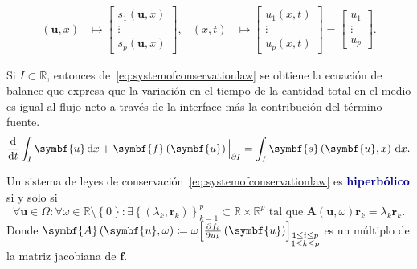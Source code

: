 \begin{definition}
\begin{align*}
		\left(\symbf{u},x\right)                             &
		\longmapsto
		\begin{bmatrix}
			s_{1}\left(\symbf{u},x\right) \\
			\vdots                        \\
			s_{p}\left(\symbf{u},x\right)
		\end{bmatrix},                     &
		\left(x,t\right)                                     &
		\longmapsto
		\begin{bmatrix}
			u_{1}\left(x,t\right) \\
			\vdots                \\
			u_{p}\left(x,t\right)
		\end{bmatrix}=
		\begin{bmatrix}
			u_{1}  \\
			\vdots \\
			u_{p}
		\end{bmatrix}.
	\end{align*}
\end{definition}
Si $I\subset\mathbb{R}$, entonces
de~\eqref{eq:systemofconservationlaw} se obtiene la ecuación de
balance que expresa que la variación en el tiempo de la cantidad
total en el medio es igual al flujo neto a través de la interface
más la contribución del término fuente.
\begin{equation*}
	\diff{}{t}
	\int_{I}\symbf{u}\dl x+
	{\symbf{f}\left(\symbf{u}\right)\Big|}_{\partial I}=
	\int_{I}\symbf{s}\left(\symbf{u},x\right)\dl x.
\end{equation*}

\begin{definition}
	Un sistema de leyes de
	conservación~\eqref{eq:systemofconservationlaw} es
	\textcolor{DarkBlue}{\bfseries hiperbólico} si y solo si
	\begin{equation}
		\forall\symbf{u}\in\Omega\!:
		\forall\omega\in\mathbb{R}\setminus\left\{0\right\}\!:
		\exists
		{\left\{
			\left(\lambda_{k},\symbf{r}_{k}\right)
			\right\}}^{p}_{k=1}\subset
		\mathbb{R}\times\mathbb{R}^{p}
		\text{ tal que }
		\symbf{A}\left(\symbf{u},\omega\right)
		\symbf{r}_{k}=
		\lambda_{k}
		\symbf{r}_{k}.
	\end{equation}
	Donde
	\begin{math}
		\symbf{A}\left(\symbf{u},\omega\right)\coloneqq
		\omega
		{
			\begin{bmatrix}
				\diffp{f_{i}}{u_{k}}
				\left(\symbf{u}\right)
			\end{bmatrix}}_{\substack{1\leq i\leq p\\1\leq k\leq p}}
	\end{math}
	es un múltiplo de la matriz jacobiana de $\mathbf{f}$.
\end{definition}

